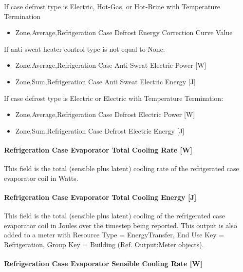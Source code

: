 If case defrost type is Electric, Hot-Gas, or Hot-Brine with Temperature Termination

\begin{itemize}
\tightlist
\item
  Zone,Average,Refrigeration Case Defrost Energy Correction Curve Value
\end{itemize}

If anti-sweat heater control type is not equal to None:

\begin{itemize}
\item
  Zone,Average,Refrigeration Case Anti Sweat Electric Power {[}W{]}
\item
  Zone,Sum,Refrigeration Case Anti Sweat Electric Energy {[}J{]}
\end{itemize}

If case defrost type is Electric or Electric with Temperature Termination:

\begin{itemize}
\item
  Zone,Average,Refrigeration Case Defrost Electric Power {[}W{]}
\item
  Zone,Sum,Refrigeration Case Defrost Electric Energy {[}J{]}
\end{itemize}

\paragraph{Refrigeration Case Evaporator Total Cooling Rate {[}W{]}}\label{refrigeration-case-evaporator-total-cooling-rate-w}

This field is the total (sensible plus latent) cooling rate of the refrigerated case evaporator coil in Watts.

\paragraph{Refrigeration Case Evaporator Total Cooling Energy {[}J{]}}\label{refrigeration-case-evaporator-total-cooling-energy-j}

This field is the total (sensible plus latent) cooling of the refrigerated case evaporator coil in Joules over the timestep being reported. This output is also added to a meter with Resource Type = EnergyTransfer, End Use Key = Refrigeration, Group Key = Building (Ref. Output:Meter objects).

\paragraph{Refrigeration Case Evaporator Sensible Cooling Rate {[}W{]}}\label{refrigeration-case-evaporator-sensible-cooling-rate-w}

